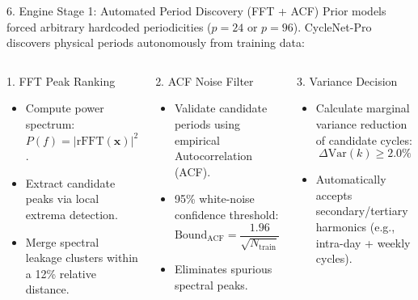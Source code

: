 \documentclass[aspectratio=169, 10pt]{beamer}
\begin{document}
\begin{frame}{6. Engine Stage 1: Automated Period Discovery (FFT + ACF)}
Prior models forced arbitrary hardcoded periodicities ($p=24$ or $p=96$). CycleNet-Pro discovers physical periods autonomously from training data:
\vspace{0.2cm}
\begin{columns}[T]
\begin{block}{1. FFT Peak Ranking}
\begin{itemize}
    \item Compute power spectrum: $P(f) = |\text{rFFT}(\mathbf{x})|^2$.
    \item Extract candidate peaks via local extrema detection.
    \item Merge spectral leakage clusters within a 12\% relative distance.
\end{itemize}
\end{block}

\begin{alertblock}{2. ACF Noise Filter}
\begin{itemize}
    \item Validate candidate periods using empirical Autocorrelation (ACF).
    \item 95\% white-noise confidence threshold:
    $$\text{Bound}_{\text{ACF}} = \frac{1.96}{\sqrt{N_{\text{train}}}}$$
    \item Eliminates spurious spectral peaks.
\end{itemize}
\end{alertblock}

\begin{exampleblock}{3. Variance Decision}
\begin{itemize}
    \item Calculate marginal variance reduction of candidate cycles:
    $$\Delta \text{Var}(k) \ge 2.0\%$$
    \item Automatically accepts secondary/tertiary harmonics (e.g., intra-day + weekly cycles).
\end{itemize}
\end{exampleblock}
\end{columns}
\end{frame}
\end{document}
